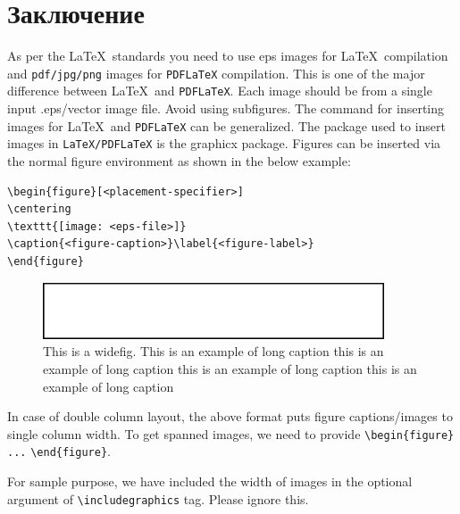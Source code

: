 \documentclass[pdflatex,sn-mathphys-num]{sn-jnl}%
\theoremstyle{thmstyleone}%
\theoremstyle{thmstyletwo}%
\theoremstyle{thmstylethree}%
\begin{document}
\section{Заключение}\label{sec6}

As per the \LaTeX\ standards you need to use eps images for \LaTeX\ compilation and \verb+pdf/jpg/png+ images for \verb+PDFLaTeX+ compilation. This is one of the major difference between \LaTeX\ and \verb+PDFLaTeX+. Each image should be from a single input .eps/vector image file. Avoid using subfigures. The command for inserting images for \LaTeX\ and \verb+PDFLaTeX+ can be generalized. The package used to insert images in \verb+LaTeX/PDFLaTeX+ is the graphicx package. Figures can be inserted via the normal figure environment as shown in the below example:

\bigskip
\begin{verbatim}
\begin{figure}[<placement-specifier>]
\centering
\texttt{[image: <eps-file>]}
\caption{<figure-caption>}\label{<figure-label>}
\end{figure}
\end{verbatim}
\bigskip

\begin{figure}[h]
\centering
\includegraphics[width=0.9\textwidth]{fig.eps}
\caption{This is a widefig. This is an example of long caption this is an example of long caption  this is an example of long caption this is an example of long caption}\label{fig1}
\end{figure}

In case of double column layout, the above format puts figure captions/images to single column width. To get spanned images, we need to provide \verb+\begin{figure}+ \verb+...+ \verb+\end{figure}+.

For sample purpose, we have included the width of images in the optional argument of \verb+\includegraphics+ tag. Please ignore this. 
\end{document}
